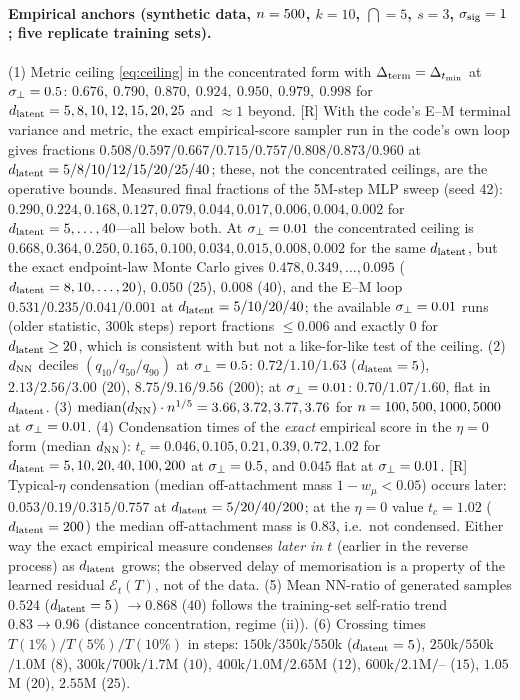 \paragraph{Empirical anchors (synthetic data, $n=500$, $k=10$, $\dint=5$, $s=3$, $\sigma_{\mathrm{sig}}=1$; five replicate training sets).}
(1) Metric ceiling \eqref{eq:ceiling} in the concentrated form with $\Delta_{\rm term}=\Delta_{t_{\min}}$ at $\sigma_{\perp}=0.5$: $0.676,\ 0.790,\ 0.870,\ 0.924,\ 0.950,\ 0.979,\ 0.998$ for $d_{\mathrm{latent}}=5,8,10,12,15,20,25$ and $\approx1$ beyond. [R] With the code's E--M terminal variance and metric, the exact empirical-score sampler run in the code's own loop gives fractions $0.508/0.597/0.667/0.715/0.757/0.808/0.873/0.960$ at $d_{\mathrm{latent}}=5/8/10/12/15/20/25/40$; these, not the concentrated ceilings, are the operative bounds. Measured final fractions of the 5M-step MLP sweep (seed 42): $0.290,0.224,0.168,0.127,0.079,0.044,0.017,0.006,0.004,0.002$ for $d_{\mathrm{latent}}=5,\dots,40$---all below both. At $\sigma_{\perp}=0.01$ the concentrated ceiling is $0.668,0.364,0.250,0.165,0.100,0.034,0.015,0.008,0.002$ for the same $d_{\mathrm{latent}}$, but the exact endpoint-law Monte Carlo gives $0.478,0.349,\dots,0.095$ ($d_{\mathrm{latent}}=8,10,\dots,20$), $0.050$ ($25$), $0.008$ ($40$), and the E--M loop $0.531/0.235/0.041/0.001$ at $d_{\mathrm{latent}}=5/10/20/40$; the available $\sigma_{\perp}=0.01$ runs (older statistic, $300$k steps) report fractions $\le0.006$ and exactly $0$ for $d_{\mathrm{latent}}\ge20$, which is consistent with but not a like-for-like test of the ceiling. (2) $d_{\rm NN}$ deciles $(q_{10}/q_{50}/q_{90})$ at $\sigma_{\perp}=0.5$: $0.72/1.10/1.63$ ($d_{\mathrm{latent}}=5$), $2.13/2.56/3.00$ ($20$), $8.75/9.16/9.56$ ($200$); at $\sigma_{\perp}=0.01$: $0.70/1.07/1.60$, flat in $d_{\mathrm{latent}}$. (3) $\mathrm{median}(d_{\rm NN})\cdot n^{1/5}=3.66,3.72,3.77,3.76$ for $n=100,500,1000,5000$ at $\sigma_{\perp}=0.01$. (4) Condensation times of the \emph{exact} empirical score in the $\eta=0$ form (median $d_{\rm NN}$): $t_c=0.046,0.105,0.21,0.39,0.72,1.02$ for $d_{\mathrm{latent}}=5,10,20,40,100,200$ at $\sigma_{\perp}=0.5$, and $0.045$ flat at $\sigma_{\perp}=0.01$. [R] Typical-$\eta$ condensation (median off-attachment mass $1-w_\mu<0.05$) occurs later: $0.053/0.19/0.315/0.757$ at $d_{\mathrm{latent}}=5/20/40/200$; at the $\eta=0$ value $t_c=1.02$ ($d_{\mathrm{latent}}=200$) the median off-attachment mass is $0.83$, i.e.\ not condensed. Either way the exact empirical measure condenses \emph{later in $t$} (earlier in the reverse process) as $d_{\mathrm{latent}}$ grows; the observed delay of memorisation is a property of the learned residual $\mathcal E_t(T)$, not of the data. (5) Mean NN-ratio of generated samples $0.524$ ($d_{\mathrm{latent}}=5$) $\to0.868$ ($40$) follows the training-set self-ratio trend $0.83\to0.96$ (distance concentration, regime (ii)). (6) Crossing times $T(1\%)/T(5\%)/T(10\%)$ in steps: $150$k$/350$k$/550$k ($d_{\mathrm{latent}}=5$), $250$k$/550$k$/1.0$M ($8$), $300$k$/700$k$/1.7$M ($10$), $400$k$/1.0$M$/2.65$M ($12$), $600$k$/2.1$M$/$-- ($15$), $1.05$M ($20$), $2.55$M ($25$).

